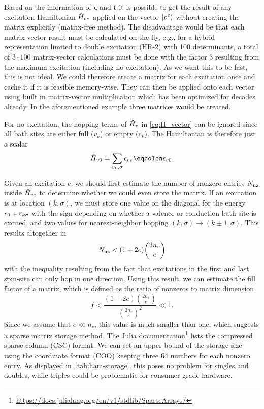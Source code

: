 Based on the information of $\symbf{\epsilon}$ and $\mathbf{t}$
it is possible to
get the result of any excitation Hamiltonian $\hat{H}_{ve}$ applied
on the vector $\ket{v^e}$ without creating the matrix explicitly
(matrix-free method).
The disadvantage would be that each matrix-vector result must be calculated
on-the-fly,
e.g., for a hybrid representation limited to double excitation (HR-2)
with 100 determinants,
a total of $3\cdot100$ matrix-vector calculations must be done with
the factor 3 resulting from the maximum excitation (including no excitation).
As we want this to be fast, this is not ideal.
We could therefore create a matrix for each excitation once
and cache it if it is feasible memory-wise.
They can then be applied onto each vector
using built in matrix-vector multiplication
which has been optimized for decades already.
In the aforementioned example three matrices would be created.

For no excitation, the hopping terms of $\hat{H}_v$ in \cref{eq:H_vector} can
be ignored since all bath sites are either full ($v_k$) or empty ($c_k$).
The Hamiltonian is therefore just a scalar
\begin{equation}
    \ham_{v0} = \sum_{v_k,\sigma} \epsilon_{v_k} \eqcolon \epsilon_{v0}.
\end{equation}

Given an excitation $e$,
we should first estimate the number of nonzero entries $N_{\text{nz}}$
inside $\hat{H}_{ve}$ to determine whether we could even store the matrix.
If an excitation is at location $(k, \sigma)$,
we must store one value on the diagonal
for the energy $\epsilon_0 \mp \epsilon_{k\sigma}$
with the sign depending on whether
a valence or conduction bath site is excited,
and two values for nearest-neighbor hopping
$(k, \sigma) \rightarrow (k\pm1, \sigma)$.
This results altogether in
\begin{equation}
    N_{\text{nz}} <
    (1+2e) \binom{2n_{v}}{e}
\end{equation}
with the inequality resulting from the fact that
excitations in the first and last spin-site can only hop in one direction.
Using this result, we can estimate the fill factor of a matrix,
which is defined as the ratio of nonzeros to matrix dimension
\begin{equation}
    f < \frac{\displaystyle(1+2e)\binom{2n_v}{e}}
    {\displaystyle\binom{2n_v}{e}^2}
    \ll 1.
\end{equation}
Since we assume that $e \ll n_v$,
this value is much smaller than one,
which suggests a sparse matrix storage method.
The Julia documentation\footnote{
    \url{https://docs.julialang.org/en/v1/stdlib/SparseArrays/}}
lists the compressed sparse column (CSC) format.
We can set an upper bound of the storage size using the coordinate format (COO)
keeping three \qty{64}{\bit} numbers for each nonzero entry.
As displayed in~\cref{tab:ham-storage},
this poses no problem for singles and doubles,
while triples could be problematic for consumer grade hardware.

